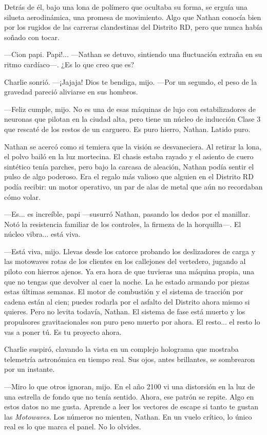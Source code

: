 \documentclass[12pt,a4paper]{book}
\begin{document}
Detrás de él, bajo una lona de polímero que ocultaba su forma, se erguía una silueta aerodinámica, una promesa de movimiento. Algo que Nathan conocía bien por los rugidos de las carreras clandestinas del Distrito RD, pero que nunca había soñado con tocar.

---Cion papi. Papi!... ---Nathan se detuvo, sintiendo una fluctuación extraña en su ritmo cardíaco---. ¿Es lo que creo que es?

Charlie sonrió. ---¡Jajaja! Dios te bendiga, mijo. ---Por un segundo, el peso de la gravedad pareció aliviarse en sus hombros.

---Feliz cumple, mijo. No es una de esas máquinas de lujo con estabilizadores de neuronas que pilotan en la ciudad alta, pero tiene un núcleo de inducción Clase 3 que rescaté de los restos de un carguero. Es puro hierro, Nathan. Latido puro.

Nathan se acercó como si temiera que la visión se desvaneciera. Al retirar la lona, el polvo bailó en la luz mortecina. El chasis estaba rayado y el asiento de cuero sintético tenía parches, pero bajo la carcasa de aleación, Nathan podía sentir el pulso de algo poderoso. Era el regalo más valioso que alguien en el Distrito RD podía recibir: un motor operativo, un par de alas de metal que aún no recordaban cómo volar.

---Es... es increíble, papi ---susurró Nathan, pasando los dedos por el manillar. Notó la resistencia familiar de los controles, la firmeza de la horquilla---. El núcleo vibra... está viva.

---Está viva, mijo. Llevas desde los catorce probando los deslizadores de carga y las motowaves rotas de los clientes en los callejones del vertedero, jugando al piloto con hierros ajenos. Ya era hora de que tuvieras una máquina propia, una que no tengas que devolver al caer la noche. La he estado armando por piezas estas últimas semanas. El motor de combustión y el sistema de tracción por cadena están al cien; puedes rodarla por el asfalto del Distrito ahora mismo si quieres. Pero no levita todavía, Nathan. El sistema de fase está muerto y los propulsores gravitacionales son puro peso muerto por ahora. El resto... el resto lo vas a poner tú. Es tu proyecto ahora.

Charlie suspiró, clavando la vista en un complejo holograma que mostraba telemetría astronómica en tiempo real. Sus ojos, antes brillantes, se sombrearon por un instante.

---Miro lo que otros ignoran, mijo. En el año 2100 vi una distorsión en la luz de una estrella de fondo que no tenía sentido. Ahora, ese patrón se repite. Algo en estos datos no me gusta. Aprende a leer los vectores de escape si tanto te gustan las \textit{Motowaves}. Los números no mienten, Nathan. En un vuelo crítico, lo único real es lo que marca el panel. No lo olvides.
\end{document}
